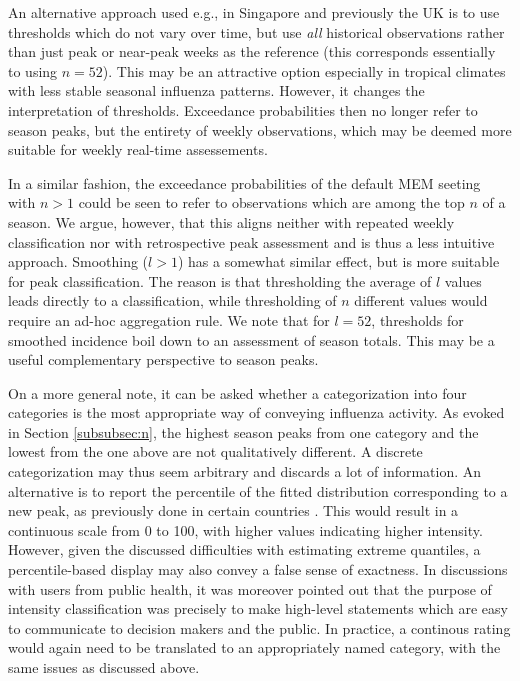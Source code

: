 \documentclass[12pt]{article}
\begin{document}
An alternative approach used e.g., in Singapore \citep{Pung2020} and previously the UK \citep{Green2015} is to use thresholds which do not vary over time, but use \textit{all} historical observations rather than just peak or near-peak weeks as the reference (this corresponds essentially to using $n = 52$). This may be an attractive option especially in tropical climates with less stable seasonal influenza patterns. However, it changes the interpretation of thresholds. Exceedance probabilities then no longer refer to season peaks, but the entirety of weekly observations, which may be deemed more suitable for weekly real-time assessements.

In a similar fashion, the exceedance probabilities of the default MEM seeting with $n > 1$ could be seen to refer to observations which are among the top $n$ of a season. We argue, however, that this aligns neither with repeated weekly classification nor with retrospective peak assessment and is thus a less intuitive approach. Smoothing ($l > 1$) has a somewhat similar effect, but is more suitable for peak classification. The reason is that thresholding the average of $l$ values leads directly to a classification, while thresholding of $n$ different values would require an ad-hoc aggregation rule. We note that for $l = 52$, thresholds for smoothed incidence boil down to an assessment of season totals. This may be a useful complementary perspective to season peaks.  %

On a more general note, it can be asked whether a categorization into four categories is the most appropriate way of conveying influenza activity. As evoked in Section \ref{subsubsec:n}, the highest season peaks from one category and the lowest from the one above are not qualitatively different. A discrete categorization may thus seem arbitrary and discards a lot of information. An alternative is to report the percentile of the fitted distribution corresponding to a new peak, as previously done in certain countries \citep{Green2015}. This would result in a continuous scale from 0 to 100, with higher values indicating higher intensity. However, given the discussed difficulties with estimating extreme quantiles, a percentile-based display may also convey a false sense of exactness. In discussions with users from public health, it was moreover pointed out that the purpose of intensity classification was precisely to make high-level statements which are easy to communicate to decision makers and the public. In practice, a continous rating would again need to be translated to an appropriately named category, with the same issues as discussed above.
\end{document}
